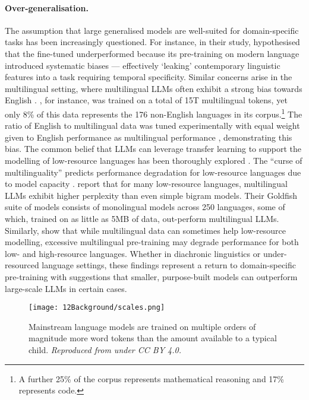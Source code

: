 \paragraph{Over-generalisation.} The assumption that large generalised models are well-suited for domain-specific tasks has been increasingly questioned. For instance, in their study, \citet{fittschen2025pretraininglanguagemodelsdiachronic} hypothesised that the fine-tuned  underperformed because its pre-training on modern language introduced systematic biases --- effectively `leaking' contemporary linguistic features into a task requiring temporal specificity. Similar concerns arise in the multilingual setting, where multilingual LLMs often exhibit a strong bias towards English \citep{wendler-etal-2024-llamas}. , for instance, was trained on a total of 15T multilingual tokens, yet only 8\% of this data represents the 176 non-English languages in its corpus.\footnote{A further 25\% of the corpus represents mathematical reasoning and 17\% represents code.} The ratio of English to multilingual data was tuned experimentally with equal weight given to English performance as multilingual performance \citep{grattafiori2024llama}, demonstrating this bias. The common belief that LLMs can leverage transfer learning to support the modelling of low-resource languages has been thoroughly explored \citep{wu-dredze-2019-beto}. The ``curse of multilinguality'' predicts performance degradation for low-resource languages due to model capacity \citep{conneau2020unsupervised}. \citet{chang2024goldfish} report that for many low-resource languages, multilingual LLMs exhibit higher perplexity than even simple bigram models. Their Goldfish suite of models consists of monolingual models across 250 languages, some of which, trained on as little as 5MB of data, out-perform multilingual LLMs. Similarly, \citet{chang2024multilinguality} show that while multilingual data can sometimes help low-resource modelling, excessive multilingual pre-training may degrade performance for both low- and high-resource languages. Whether in diachronic linguistics or under-resourced language settings, these findings represent a return to domain-specific pre-training with suggestions that smaller, purpose-built models can outperform large-scale LLMs in certain cases.

\begin{figure}
    \centering
    \texttt{[image: 12Background/scales.png]}
    \caption{Mainstream language models are trained on multiple orders of magnitude more word tokens than the amount available to a typical child. \emph{Reproduced from \citet{wilcox2025bigger} under CC BY 4.0.}}
    \label{fig:12-scales}
\end{figure}

